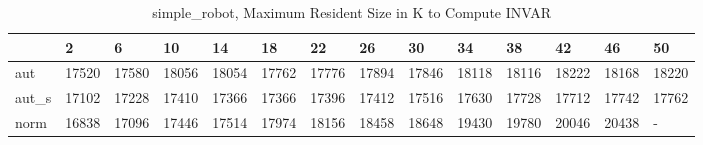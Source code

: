 \begin{table}
\caption{simple_robot, Maximum Resident Size in K to Compute INVAR}
\label{simple_robot_INVAR_size}
\begin{tabular}{llllllllllllll}
\toprule
 & 2 & 6 & 10 & 14 & 18 & 22 & 26 & 30 & 34 & 38 & 42 & 46 & 50 \\
\midrule
aut & 17520 & 17580 & 18056 & 18054 & 17762 & 17776 & 17894 & 17846 & 18118 & 18116 & 18222 & 18168 & 18220 \\
aut_s & 17102 & 17228 & 17410 & 17366 & 17366 & 17396 & 17412 & 17516 & 17630 & 17728 & 17712 & 17742 & 17762 \\
norm & 16838 & 17096 & 17446 & 17514 & 17974 & 18156 & 18458 & 18648 & 19430 & 19780 & 20046 & 20438 & - \\
\bottomrule
\end{tabular}
\end{table}
